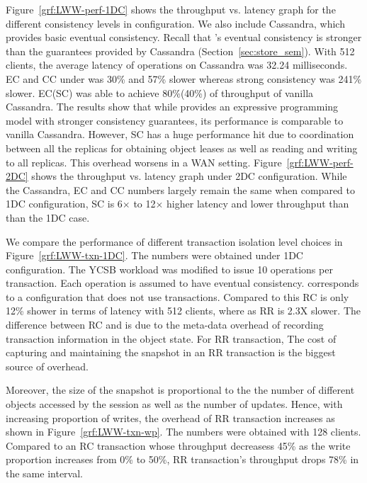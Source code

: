 Figure~\ref{grf:LWW-perf-1DC} shows the throughput vs. latency graph for the
different consistency levels in  configuration. We also include
Cassandra, which provides basic eventual consistency. Recall that \name's
eventual consistency is stronger than the guarantees provided by Cassandra
(Section~\ref{sec:store_sem}). With 512 clients, the average latency of
operations on Cassandra was 32.24 milliseconds. EC and CC under \name was 30\%
and 57\% slower whereas strong consistency was 241\% slower. EC(SC) was able to
achieve 80\%(40\%) of throughput of vanilla Cassandra. The results show that
while \name provides an expressive programming model with stronger consistency
guarantees, its performance is comparable to vanilla Cassandra. However, SC has
a huge performance hit due to coordination between all the replicas for
obtaining object leases as well as reading and writing to all replicas. This
overhead worsens in a WAN setting. Figure~\ref{grf:LWW-perf-2DC} shows the
throughput vs. latency graph under 2DC configuration. While the Cassandra, EC
and CC numbers largely remain the same when compared to 1DC configuration, SC
is 6$\times$ to 12$\times$ higher latency and lower throughput than than the
1DC case.

We compare the performance of different transaction isolation level choices in
Figure~\ref{grf:LWW-txn-1DC}. The numbers were obtained under 1DC
configuration. The YCSB workload was modified to issue 10 operations per
transaction. Each operation is assumed to have eventual consistency. 
corresponds to a configuration that does not use transactions. Compared to this
RC is only 12\% shower in terms of latency with 512 clients, where as RR is
2.3X slower. The difference between RC and  is due to the meta-data
overhead of recording transaction information in the object state. For RR
transaction, The cost of capturing and maintaining the snapshot in an RR
transaction is the biggest source of overhead.

Moreover, the size of the snapshot is proportional to the the number of
different objects accessed by the session as well as the number of updates.
Hence, with increasing proportion of writes, the overhead of RR transaction
increases as shown in Figure~\ref{grf:LWW-txn-wp}. The numbers were obtained
with 128 clients. Compared to an RC transaction whose throughput decreasess
45\% as the write proportion increases from 0\% to 50\%, RR transaction's
throughput drops 78\% in the same interval.
